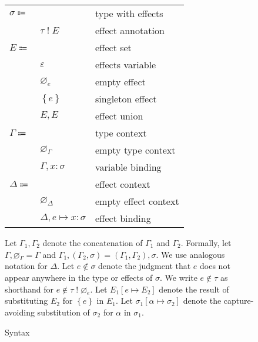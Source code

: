 \documentclass[12pt]{article}
\newcommand\parens[1]{\left( #1 \right)} %
\newcommand\evar{x}
\newcommand\ttype{\tau}
\newcommand\tvar{\alpha}
\newcommand\tanno[2]{#1 : #2} %
\newcommand\tx{\sigma}
\newcommand\twithx[2]{#1 \; ! \; #2} %
\newcommand\tsub[3]{#1 \left[ #2 \mapsto #3 \right]} %
\newcommand\xeffect{e}
\newcommand\xvar{\varepsilon}
\newcommand\xsingleton[1]{\left\{#1\right\}}
\newcommand\xeffects{E}
\newcommand\xempty{\varnothing_{\xeffect}}
\newcommand\xunion[2]{#1, #2}
\newcommand\xnotint[2]{#1 \notin #2} %
\newcommand\xsub[3]{#1 \left[ #2 \mapsto #3 \right]} %
\newcommand\ccontext{\Gamma}
\newcommand\cempty{\varnothing_{\ccontext}}
\newcommand\cextend[2]{#1, #2}
\newcommand\cunion[2]{#1, #2}
\newcommand\dcontext{\Delta}
\newcommand\dempty{\varnothing_{\dcontext}}
\newcommand\dextend[2]{#1, #2}
\newcommand\deffect[3]{#1 \mapsto \tanno{#2}{#3}} %
\begin{document}
\begin{figure}
\begin{mdframed}[backgroundcolor=none]
\begin{center}
\begin{tabular}{l l l}
          $\tx \Coloneqq$ & & type with effects \\
          & $\twithx{\ttype}{\xeffects}$ & effect annotation \\
          $\xeffects \Coloneqq$ & & effect set \\
          & $\xvar$ & effects variable \\
          & $\xempty$ & empty effect \\
          & $\xsingleton{\xeffect}$ & singleton effect \\
          & $\xunion{\xeffects}{\xeffects}$ & effect union \\
          $\ccontext \Coloneqq$ & & type context \\
          & $\cempty$ & empty type context \\
          & $\cextend{\ccontext}{\tanno{\evar}{\tx}}$ & variable binding \\
          $\dcontext \Coloneqq$ & & effect context \\
          & $\dempty$ & empty effect context \\
          & $\dextend{\dcontext}{\deffect{\xeffect}{\evar}{\tx}}$ & effect binding \\
        \end{tabular}
      \end{center}

      \bigskip

      Let $\cunion{\ccontext_1}{\ccontext_2}$ denote the concatenation of $\ccontext_1$ and $\ccontext_2$. Formally, let $\cunion{\ccontext}{\cempty} = \ccontext$ and $\cunion{\ccontext_1}{\parens{\cextend{\ccontext_2}{\tx}}} = \cextend{\parens{\cunion{\ccontext_1}{\ccontext_2}}}{\tx}$. We use analogous notation for $\dcontext$. Let $\xnotint{\xeffect}{\tx}$ denote the judgment that $\xeffect$ does not appear anywhere in the type or effects of $\tx$. We write $\xnotint{\xeffect}{\ttype}$ as shorthand for $\xnotint{\xeffect}{\twithx{\ttype}{\xempty}}$. Let $\xsub{\xeffects_1}{\xeffect}{\xeffects_2}$ denote the result of substituting $\xeffects_2$ for $\xsingleton{\xeffect}$ in $\xeffects_1$. Let $\tsub{\tx_1}{\tvar}{\tx_2}$ denote the capture-avoiding substitution of $\tx_2$ for $\tvar$ in $\tx_1$.

      \caption{Syntax}\label{fig:syntax}
    \end{mdframed}
  \end{figure}
\end{document}
